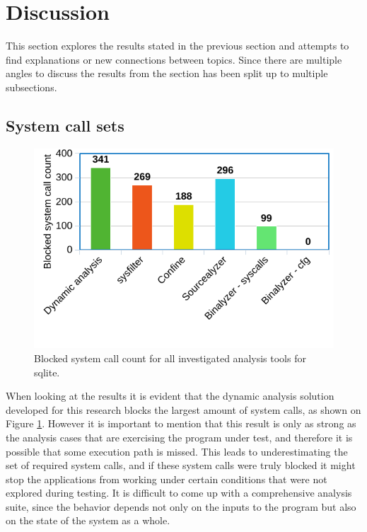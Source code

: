 \section{Discussion}
\label{sec:discussion}
This section explores the results stated in the previous section and attempts to find explanations or new connections between topics. Since there are multiple angles to discuss the results from the section has been split up to multiple subsections.

\subsection {System call sets}
\begin{figure}
    \centering
    \includegraphics[width=\columnwidth]{./chart_syscalls.png}
    \caption{Blocked system call count for all investigated analysis tools for sqlite.}
    \label{fig:block_count}
\end{figure}
When looking at the results it is evident that the dynamic analysis solution developed for this research blocks the largest amount of system calls, as shown on Figure \ref{fig:block_count}.
However it is important to mention that this result is only as strong as the analysis cases that are exercising the program under test, and therefore it is possible that some execution path is missed.
This leads to underestimating the set of required system calls, and if these system calls were truly blocked it might stop the applications from working under certain conditions that were not explored during testing.
It is difficult to come up with a comprehensive analysis suite, since the behavior depends not only on the inputs to the program but also on the state of the system as a whole.

